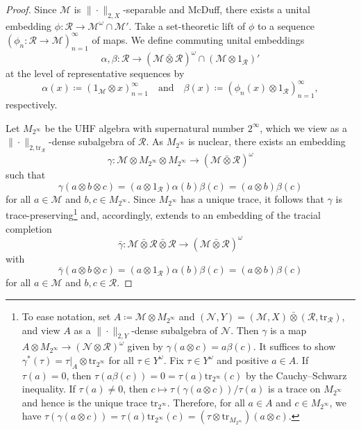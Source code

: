 \documentclass[a4paper,11pt]{amsart}
\theoremstyle{definition}
\numberwithin{equation}{section}
\numberwithin{theorem}{section}
\newcommand{\R}{\mathcal R}
\newcommand{\tr}{\mathrm{tr}}
\newcommand{\M}{\mathcal{M}}
\newcommand{\barotimes}{\bar\otimes}
\begin{document}
\begin{proof}
Since  $\M$ is $\|\cdot\|_{2, X}$-separable and McDuff, there exists a unital embedding $\phi\colon \R \rightarrow \M^\omega \cap \M'$.
Take a set-theoretic lift of $\phi$ to a sequence $(\phi_{n}\colon \R \to \M)_{n=1}^\infty$  of maps.
We define commuting unital embeddings 
\begin{equation}
    \alpha,\beta\colon \R \rightarrow (\M \barotimes \R)^\omega \cap (\M \otimes 1_{\R})'
\end{equation}
at the level of representative sequences by 
\begin{equation}
    \alpha(x)\coloneqq (1_{\M} \otimes x)_{n=1}^\infty \quad \text{and} \quad \beta(x) \coloneqq (\phi_n(x) \otimes 1_{\R} )_{n=1}^\infty,
\end{equation} respectively. 

Let $M_{2^\infty}$ be the UHF algebra with supernatural number $2^\infty$, which we view as a $\|\cdot\|_{2,\tr_\R}$-dense subalgebra of $\R$.
As $M_{2^\infty}$ is nuclear, there exists an embedding 
\begin{equation}
    \gamma\colon  \M \otimes M_{2^\infty}  \otimes M_{2^\infty}  \longrightarrow (\M \barotimes \R)^\omega
\end{equation}
such that 
\begin{equation}
    \gamma(a \otimes b \otimes c) = (a \otimes 1_\R)\alpha(b)\beta(c)= (a \otimes b)\beta(c)
\end{equation}
for all $a \in \M$ and $b,c \in M_{2^\infty}$.
Since  $M_{2^\infty}$ has a unique trace, it follows that $\gamma$ is trace-preserving\footnote{To ease notation, set $A \coloneqq \mathcal M \otimes  M_{2^\infty}$ and $(\mathcal N, Y) = (\mathcal M, X) \bar\otimes (\mathcal R, \mathrm{tr}_\mathcal R)$, and view $A$ as a $\|\cdot\|_{2, Y}$-dense subalgebra of $\mathcal N$.  Then $\gamma$ is a map $A \otimes M_{2^\infty} \rightarrow (\mathcal N \otimes \mathcal R)^\omega$ given by $\gamma(a \otimes c) = a \beta(c)$.  It suffices to show $\gamma^*(\tau) = \tau|_A \otimes \mathrm{tr}_{2^\infty}$ for all $\tau \in Y^\omega$.  Fix $\tau \in Y^\omega$ and positive $a \in A$.  If $\tau(a) = 0$, then $\tau(a \beta(c)) = 0 = \tau(a) \mathrm{tr}_{2^\infty}(c)$ by the Cauchy--Schwarz inequality.  If $\tau(a) \neq 0$, then $c \mapsto \tau(\gamma(a \otimes c)) / \tau(a)$ is a trace on $M_{2^\infty}$ and hence is the unique trace $\mathrm{tr}_{2^\infty}$.  Therefore, for all $a \in A$ and $c \in M_{2^\infty}$, we have $\tau(\gamma(a \otimes c)) = \tau(a) \mathrm{tr}_{2^\infty}(c) = (\tau \otimes \mathrm{tr}_{M_{2^\infty}})(a\otimes c)$.}
and, accordingly,  extends to an embedding of the tracial completion 
\begin{equation}
    \bar{\gamma}\colon \M \barotimes \R \barotimes \R \longrightarrow (\M \barotimes \R)^\omega
\end{equation}
with 
\begin{equation}
    \bar{\gamma}(a \otimes b \otimes c) = (a \otimes 1_\R)\alpha(b)\beta(c) = (a \otimes b)\beta(c)
\end{equation}
for all  $a \in \M$ and $b,c \in \R$.


\end{proof}
\end{document}
